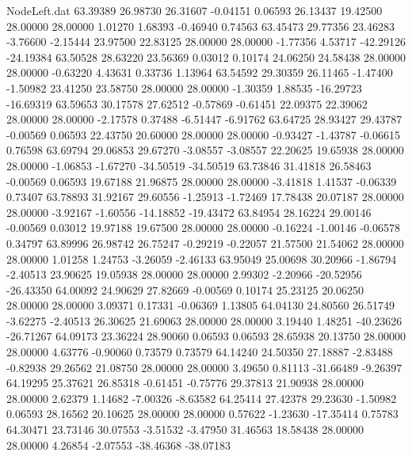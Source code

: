\begin{filecontents}{NodeLeft.dat}
  63.39389   26.98730   26.31607    -0.04151    0.06593   26.13437   19.42500   28.00000   28.00000    1.01270    1.68393   -0.46940    0.74563
  63.45473   29.77356   23.46283    -3.76600   -2.15444   23.97500   22.83125   28.00000   28.00000   -1.77356    4.53717  -42.29126  -24.19384
  63.50528   28.63220   23.56369     0.03012    0.10174   24.06250   24.58438   28.00000   28.00000   -0.63220    4.43631    0.33736    1.13964
  63.54592   29.30359   26.11465    -1.47400   -1.50982   23.41250   23.58750   28.00000   28.00000   -1.30359    1.88535  -16.29723  -16.69319
  63.59653   30.17578   27.62512    -0.57869   -0.61451   22.09375   22.39062   28.00000   28.00000   -2.17578    0.37488   -6.51447   -6.91762
  63.64725   28.93427   29.43787    -0.00569    0.06593   22.43750   20.60000   28.00000   28.00000   -0.93427   -1.43787   -0.06615    0.76598
  63.69794   29.06853   29.67270    -3.08557   -3.08557   22.20625   19.65938   28.00000   28.00000   -1.06853   -1.67270  -34.50519  -34.50519
  63.73846   31.41818   26.58463    -0.00569    0.06593   19.67188   21.96875   28.00000   28.00000   -3.41818    1.41537   -0.06339    0.73407
  63.78893   31.92167   29.60556    -1.25913   -1.72469   17.78438   20.07187   28.00000   28.00000   -3.92167   -1.60556  -14.18852  -19.43472
  63.84954   28.16224   29.00146    -0.00569    0.03012   19.97188   19.67500   28.00000   28.00000   -0.16224   -1.00146   -0.06578    0.34797
  63.89996   26.98742   26.75247    -0.29219   -0.22057   21.57500   21.54062   28.00000   28.00000    1.01258    1.24753   -3.26059   -2.46133
  63.95049   25.00698   30.20966    -1.86794   -2.40513   23.90625   19.05938   28.00000   28.00000    2.99302   -2.20966  -20.52956  -26.43350
  64.00092   24.90629   27.82669    -0.00569    0.10174   25.23125   20.06250   28.00000   28.00000    3.09371    0.17331   -0.06369    1.13805
  64.04130   24.80560   26.51749    -3.62275   -2.40513   26.30625   21.69063   28.00000   28.00000    3.19440    1.48251  -40.23626  -26.71267
  64.09173   23.36224   28.90060     0.06593    0.06593   28.65938   20.13750   28.00000   28.00000    4.63776   -0.90060    0.73579    0.73579
  64.14240   24.50350   27.18887    -2.83488   -0.82938   29.26562   21.08750   28.00000   28.00000    3.49650    0.81113  -31.66489   -9.26397
  64.19295   25.37621   26.85318    -0.61451   -0.75776   29.37813   21.90938   28.00000   28.00000    2.62379    1.14682   -7.00326   -8.63582
  64.25414   27.42378   29.23630    -1.50982    0.06593   28.16562   20.10625   28.00000   28.00000    0.57622   -1.23630  -17.35414    0.75783
  64.30471   23.73146   30.07553    -3.51532   -3.47950   31.46563   18.58438   28.00000   28.00000    4.26854   -2.07553  -38.46368  -38.07183

\end{filecontents}
